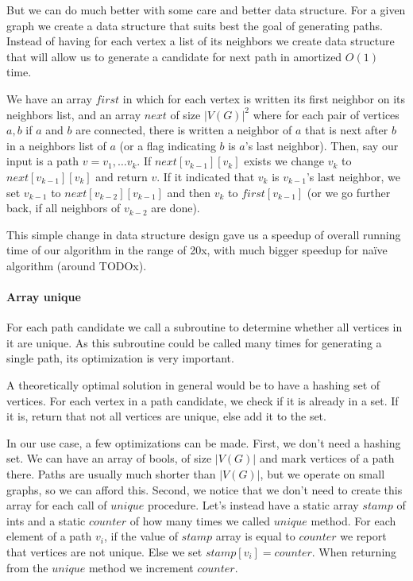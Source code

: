 But we can do much better with some care and better data structure. For a given graph we create a data structure that suits best the goal of generating paths. Instead of having for each vertex a list of its neighbors we create data structure that will allow us to generate a candidate for next path in amortized $O(1)$ time.

We have an array $first$ in which for each vertex is written its first neighbor on its neighbors list, and an array $next$ of size $|V(G)|^2$ where for each pair of vertices $a, b$ if $a$ and $b$ are connected, there is written a neighbor of $a$ that is next after $b$ in a neighbors list of $a$ (or a flag indicating $b$ is $a$'s last neighbor). Then, say our input is a path $v = v_1, \ldots v_k$. If $next[v_{k-1}][v_k]$ exists we change $v_k$ to $next[v_{k-1}][v_k]$ and return $v$. If it indicated that $v_k$ is $v_{k-1}$'s last neighbor, we set $v_{k-1}$ to $next[v_{k-2}][v_{k-1}]$ and then $v_k$ to $first[v_{k-1}]$ (or we go further back, if all neighbors of $v_{k-2}$ are done).

This simple change in data structure design gave us a speedup of overall running time of our algorithm in the range of 20x, with much bigger speedup for na\"ive algorithm (around TODOx).

\paragraph{Array unique}

For each path candidate we call a subroutine to determine whether all vertices in it are unique. As this subroutine could be called many times for generating a single path, its optimization is very important.

A theoretically optimal solution in general would be to have a hashing set of vertices. For each vertex in a path candidate, we check if it is already in a set. If it is, return that not all vertices are unique, else add it to the set.

In our use case, a few optimizations can be made. First, we don't need a hashing set. We can have an array of bools, of size $|V(G)|$ and mark vertices of a path there. Paths are usually much shorter than $|V(G)|$, but we operate on small graphs, so we can afford this. Second, we notice that we don't need to create this array for each call of $unique$ procedure. Let's instead have a static array $stamp$ of ints and a static $counter$ of how many times we called $unique$ method. For each element of a path $v_i$, if the value of $stamp$ array is equal to $counter$ we report that vertices are not unique. Else we set $stamp[v_i] = counter$. When returning from the $unique$ method we increment $counter$.

